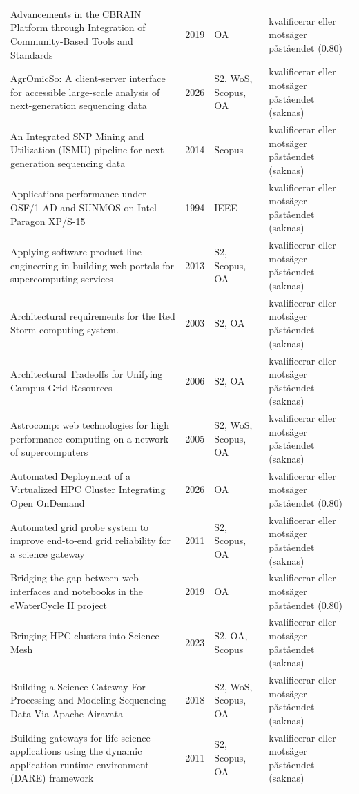 \begin{longtable}{@{}%
  >{\raggedright\arraybackslash}p{}c%
  >{\raggedright\arraybackslash}p{}%
  >{\raggedright\arraybackslash}p{}@{}}
Advancements in the CBRAIN Platform through Integration of Community-Based Tools and Standards & 2019 & OA & kvalificerar eller motsäger påståendet (0.80) \\
AgrOmicSo: A client-server interface for accessible large-scale analysis of next-generation sequencing data & 2026 & S2, WoS, Scopus, OA & kvalificerar eller motsäger påståendet (saknas) \\
An Integrated SNP Mining and Utilization (ISMU) pipeline for next generation sequencing data & 2014 & Scopus & kvalificerar eller motsäger påståendet (saknas) \\
Applications performance under OSF/1 AD and SUNMOS on Intel Paragon XP/S-15 & 1994 & IEEE & kvalificerar eller motsäger påståendet (saknas) \\
Applying software product line engineering in building web portals for supercomputing services & 2013 & S2, Scopus, OA & kvalificerar eller motsäger påståendet (saknas) \\
Architectural requirements for the Red Storm computing system. & 2003 & S2, OA & kvalificerar eller motsäger påståendet (saknas) \\
Architectural Tradeoffs for Unifying Campus Grid Resources & 2006 & S2, OA & kvalificerar eller motsäger påståendet (saknas) \\
Astrocomp: web technologies for high performance computing on a network of supercomputers & 2005 & S2, WoS, Scopus, OA & kvalificerar eller motsäger påståendet (saknas) \\
Automated Deployment of a Virtualized HPC Cluster Integrating Open OnDemand & 2026 & OA & kvalificerar eller motsäger påståendet (0.80) \\
Automated grid probe system to improve end-to-end grid reliability for a science gateway & 2011 & S2, Scopus, OA & kvalificerar eller motsäger påståendet (saknas) \\
Bridging the gap between web interfaces and notebooks in the eWaterCycle II project & 2019 & OA & kvalificerar eller motsäger påståendet (0.80) \\
Bringing HPC clusters into Science Mesh & 2023 & S2, OA, Scopus & kvalificerar eller motsäger påståendet (saknas) \\
Building a Science Gateway For Processing and Modeling Sequencing Data Via Apache Airavata & 2018 & S2, WoS, Scopus, OA & kvalificerar eller motsäger påståendet (saknas) \\
Building gateways for life-science applications using the dynamic application runtime environment (DARE) framework & 2011 & S2, Scopus, OA & kvalificerar eller motsäger påståendet (saknas) \\

\end{longtable}
